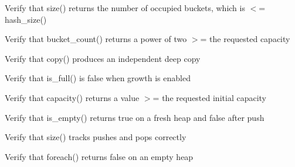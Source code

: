 \begin{DoxyRefList}
%
Verify that size() returns the number of occupied buckets, which is \texorpdfstring{$<$}{<}= hash\+\_\+size()  
\item[Global \doxylink{test__dict_8cpp_a86246bcbad6eff0d876a51e98e50d4a2}{TEST\+\_\+F} (\doxylink{classDictTest}{Dict\+Test}, Bucket\+Count\+Is\+Power\+Of\+Two\+GECapacity)]\label{test__test000263}%
%
Verify that bucket\+\_\+count() returns a power of two \texorpdfstring{$>$}{>}= the requested capacity  
\item[Global \doxylink{test__heap_8cpp_afba6c60ff20c6fc14e85e7ca65c78982}{TEST\+\_\+F} (\doxylink{classHeapMinTest}{Heap\+Min\+Test}, Copy\+Produces\+Independent\+Heap)]\label{test__test000290}%
%
Verify that copy() produces an independent deep copy  
\item[Global \doxylink{test__heap_8cpp_a695fd895e1a57fdc749d296be088851a}{TEST\+\_\+F} (\doxylink{classHeapMinTest}{Heap\+Min\+Test}, Is\+Full\+False\+When\+Growth\+Enabled)]\label{test__test000299}%
%
Verify that is\+\_\+full() is false when growth is enabled  
\item[Global \doxylink{test__heap_8cpp_aedf724f63393bd4a65a95e75a5bc8fef}{TEST\+\_\+F} (\doxylink{classHeapMinTest}{Heap\+Min\+Test}, Capacity\+At\+Least\+Requested\+Size)]\label{test__test000298}%
%
Verify that capacity() returns a value \texorpdfstring{$>$}{>}= the requested initial capacity  
\item[Global \doxylink{test__heap_8cpp_abc39bc636a1ffced754b89e0dcaa037a}{TEST\+\_\+F} (\doxylink{classHeapMinTest}{Heap\+Min\+Test}, Is\+Empty\+Fresh\+And\+After\+Push)]\label{test__test000297}%
%
Verify that is\+\_\+empty() returns true on a fresh heap and false after push  
\item[Global \doxylink{test__heap_8cpp_a7f5e109e71e6f590a94669eb8d21f997}{TEST\+\_\+F} (\doxylink{classHeapMinTest}{Heap\+Min\+Test}, Size\+Tracks\+Operations)]\label{test__test000296}%
%
Verify that size() tracks pushes and pops correctly  
\item[Global \doxylink{test__heap_8cpp_a814ea39e7fda78a32c07916bd1e939f8}{TEST\+\_\+F} (\doxylink{classHeapMinTest}{Heap\+Min\+Test}, Foreach\+On\+Empty\+Heap\+Returns\+False)]\label{test__test000294}%
%
Verify that foreach() returns false on an empty heap  
\item[Global \doxylink{test__heap_8cpp_a124d0ddc708bf7db847be8bfcd75aad7}{TEST\+\_\+F} (\doxylink{classHeapMinTest}{Heap\+Min\+Test}, Foreach\+Visits\+All\+Elements)]\label{test__test000293}%

\end{DoxyRefList}
